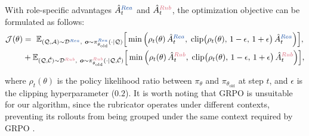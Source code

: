 With role-specific advantages $\hat{A}^{\text{\textcolor{reasoner}{$Rea$}}}_t$ and $\hat{A}^{\text{\textcolor{rubricator}{$Rub$}}}_t$, the optimization objective can be formulated as follows: 
\begin{equation}
\begin{aligned}
\mathcal{J}(\theta)
&= \ 
\mathbb{E}_{(\mathcal{Q}, \mathcal{A}) \sim \mathcal{D}^{\text{\textcolor{reasoner}{$Rea$}}},
\ \boldsymbol{o} \sim \pi^{\text{\textcolor{reasoner}{$Rea$}}}_{\theta_{\text{old}}}(\cdot \mid \mathcal{Q})}
\Big[
\min\Big(
\rho_t(\theta)\,\hat{A}^{\text{\textcolor{reasoner}{$Rea$}}}_t,\;
\text{clip}\big(
\rho_t(\theta),\,
1-\epsilon,\,
1+\epsilon
\big)\,\hat{A}^{\text{\textcolor{reasoner}{$Rea$}}}_t
\Big)
\Big],
\\
&+\mathbb{E}_{(\mathcal{Q}, \hat{\mathcal C}) \sim \mathcal{D}^{\text{\textcolor{rubricator}{$Rub$}}},
\ \boldsymbol{o} \sim \pi^{\text{\textcolor{rubricator}{$Rub$}}}_{\theta_{\text{old}}}(\cdot \mid \mathcal{Q, \hat{\mathcal C}})}
\Big[
\min\Big(
\rho_t(\theta)\,\hat{A}^{\text{\textcolor{rubricator}{$Rub$}}}_t,\;
\text{clip}\big(
\rho_t(\theta),\,
1-\epsilon,\,
1+\epsilon
\big)\,\hat{A}^{\text{\textcolor{rubricator}{$Rub$}}}_t
\Big)
\Big],
\end{aligned}
\end{equation}

where $\rho_t(\theta)$ is the policy likelihood ratio between $\pi_\theta$ and $\pi_{\theta_{\text{old}}}$ at step $t$, and $\epsilon$ is the clipping hyperparameter (\eg $0.2$). 
It is worth noting that GRPO is unsuitable for our algorithm, since the rubricator operates under different contexts, preventing its rollouts from being grouped under the same context required by GRPO \cite{DeepSeekMath}.


